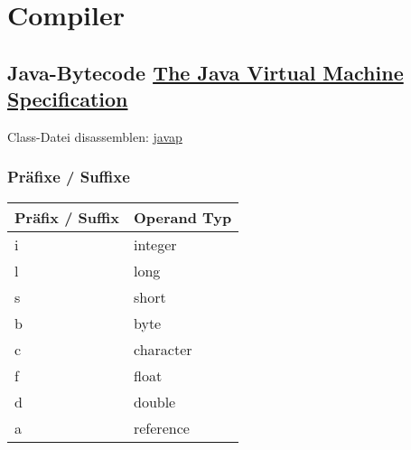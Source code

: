 \chapter{Compiler}
\section{Java-Bytecode \href{https://docs.oracle.com/javase/specs/jvms/se10/jvms10.pdf}{The Java Virtual Machine Specification}}

Class-Datei disassemblen: \href{https://docs.oracle.com/javase/7/docs/technotes/tools/windows/javap.html}{javap}

\subsection{Präfixe / Suffixe}
\begin{table}[H]
	\centering
	\label{my-label}
	\begin{tabular}{l|l}
		Präfix / Suffix	& Operand Typ\\ \hline
		i	&	integer		\\ \hline
		l	&	long		\\ \hline
		s	&	short		\\ \hline
		b	&	byte		\\ \hline
		c	&	character	\\ \hline
		f	&	float		\\ \hline
		d	&	double		\\ \hline
		a	&	reference	\\
	\end{tabular}
\end{table}

